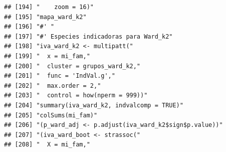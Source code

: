 \documentclass[11pt,]{article}
\begin{document}
\begin{verbatim}
## [194] "    zoom = 16)"                                                                                                                                                        
## [195] "mapa_ward_k2"                                                                                                                                                          
## [196] "#' "                                                                                                                                                                   
## [197] "#' Especies indicadoras para Ward_k2"                                                                                                                                  
## [198] "iva_ward_k2 <- multipatt("                                                                                                                                             
## [199] "  x = mi_fam,"                                                                                                                                                         
## [200] "  cluster = grupos_ward_k2,"                                                                                                                                           
## [201] "  func = 'IndVal.g',"                                                                                                                                                  
## [202] "  max.order = 2,"                                                                                                                                                      
## [203] "  control = how(nperm = 999))"                                                                                                                                         
## [204] "summary(iva_ward_k2, indvalcomp = TRUE)"                                                                                                                               
## [205] "colSums(mi_fam)"                                                                                                                                                       
## [206] "(p_ward_adj <- p.adjust(iva_ward_k2$sign$p.value))"                                                                                                                    
## [207] "(iva_ward_boot <- strassoc("                                                                                                                                           
## [208] "  X = mi_fam,"                                                                                                                                                         

\end{verbatim}
\end{document}
